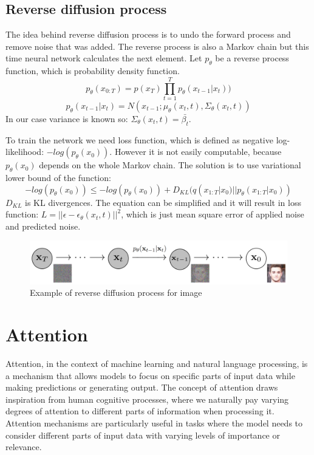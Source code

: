 \documentclass[11pt,a4paper]{report}
\begin{document}
\subsection{Reverse diffusion process}
The idea behind reverse diffusion process is to undo the forward process and remove noise that was added. The reverse process is  also a Markov chain but this time neural network calculates the next element. Let $p_\theta$ be a reverse process function, which is probability density function.
\[p_\theta(x_{0:T}) = p(x_T)\prod_{t=1}^{T}{p_\theta(x_{t-1}|x_t)})\]
\[p_\theta(x_{t-1}|x_t) = N(x_{t-1};\mu_\theta(x_t, t), \Sigma_\theta(x_t,t))\]
In our case variance is known so: $\Sigma_\theta(x_t,t)=\bar{\beta_t}$.

To train the network we need loss function, which is defined as negative log-likelihood: $-log(p_\theta(x_0))$. However it is not easily computable, because $p_\theta(x_0)$ depends on the whole Markov chain. The solution is to use variational lower bound of the function:
\[-log(p_\theta(x_0)) \le -log(p_\theta(x_0)) + D_{KL}(q(x_{1:T}|x_0)||p_\theta(x_{1:T}|x_0))\]
$D_{KL}$ is KL divergences. The equation can be simplified \cite{ImprovedDDPM} and it will result in loss function: $L=||\epsilon - \epsilon_\theta(x_t, t)||^2$, which is just mean square error of applied noise and predicted noise.

\begin{figure}[H]
	\centering
	\includegraphics[width=\textwidth]{images/reverse-diffusion}
    \caption{Example of reverse diffusion process for image \cite{DDPM}}
\end{figure}

\section{Attention}
Attention, in the context of machine learning and natural language processing, is a mechanism that allows models to focus on specific parts of input data while making predictions or generating output. The concept of attention draws inspiration from human cognitive processes, where we naturally pay varying degrees of attention to different parts of information when processing it. Attention mechanisms are particularly useful in tasks where the model needs to consider different parts of input data with varying levels of importance or relevance.
\end{document}
